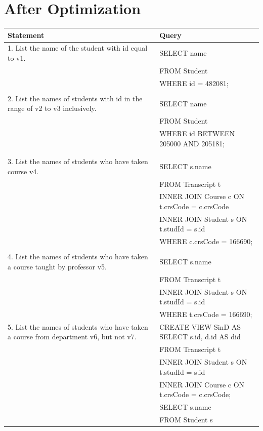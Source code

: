 \documentclass[11pt]{report}
\newcommand\tab[1][1cm]{\hspace*{#1}}
\begin{document}
\section*{After Optimization}
	\begin{flushleft}
		\begin{tabular}{m{15em}|m{27.5em}} 
			\textbf{Statement} & \textbf{Query} \\
			\hline
			\multirow{1}{15em}{1. List the name of the student with id equal to v1.} 
			& SELECT name \\ 
			& FROM Student \\ 
			& WHERE id = 482081; \\
			&\\ 
			\multirow{1}{15em}{2. List the names of students with id in the range of v2 to v3 
			inclusively.} 
			& SELECT name \\ 
			& FROM Student \\ 
			& WHERE id BETWEEN 205000 AND 205181; \\
			&\\
			&\\ 
			\multirow{1}{15em}{3. List the names of students who have taken course v4.} 
			& SELECT s.name \\ 
			& FROM Transcript t \\ 
			& INNER JOIN Course c ON t.crsCode = c.crsCode \\
			& INNER JOIN Student s ON t.studId = s.id \\
			& WHERE c.crsCode = 166690; \\
			&\\ 
			\multirow{1}{15em}{4. List the names of students who have taken a course taught by 
			professor v5.} 
			& SELECT s.name \\ 
			& FROM Transcript t \\ 
			& INNER JOIN Student s ON t.studId = s.id \\
			& WHERE t.crsCode = 166690; \\
			\multirow{1}{15em}{5. List the names of students who have taken a course from 
			department v6, but not v7.} 
			& CREATE VIEW SinD AS SELECT s.id, d.id AS did \\ 
			& \tab FROM Transcript t \\ 
			& \tab INNER JOIN Student s ON t.studId = s.id \\
			& \tab INNER JOIN Course c ON t.crsCode = c.crsCode; \\
			& SELECT s.name \\
			& FROM Student s \\

\end{tabular}
\end{flushleft}
\end{document}

